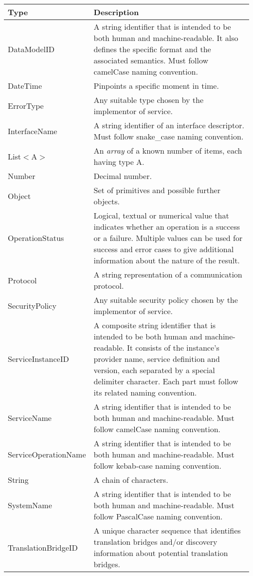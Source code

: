 \documentclass[a4paper]{arrowhead}
\newcommand{\pdef}[1]{{\textcolor{ArrowheadGrey}{#1\label{sec:model:primitives:#1}\label{sec:model:primitives:#1s}\label{sec:model:primitives:#1es}}}}
\begin{document}
\begin{table}[ht!]
\begin{tabularx}{\textwidth}{| p{5cm} | X |} \hline
\rowcolor{gray!33} Type & Description \\ \hline
\pdef{DataModelID} & A string identifier that is intended to be both human and machine-readable. It also defines the specific format and the associated semantics. Must follow camelCase naming convention. \\ \hline
\pdef{DateTime}         & Pinpoints a specific moment in time. \\ \hline
\pdef{ErrorType}        & Any suitable type chosen by the implementor of service. \\ \hline
\pdef{InterfaceName}    & A string identifier of an interface descriptor. Must follow snake\_case naming convention. \\ \hline
\pdef{List}$<$A$>$      & An \textit{array} of a known number of items, each having type A. \\ \hline
\pdef{Number}           & Decimal number. \\ \hline
\pdef{Object}           & Set of primitives and possible further objects. \\ \hline
\pdef{OperationStatus}  & Logical, textual or numerical value that indicates whether an operation is a success or a failure. Multiple values can be used for success and error cases to give additional information about the nature of the result. \\ \hline
\pdef{Protocol}         & A string representation of a communication protocol. \\ \hline
\pdef{SecurityPolicy}   & Any suitable security policy chosen by the implementor of service. \\ \hline
\pdef{ServiceInstanceID} & A composite string identifier that is intended to be both human and machine-readable. It consists of the instance's provider name, service definition and version, each separated by a special delimiter character. Each part must follow its related naming convention. \\ \hline
\pdef{ServiceName}      & A string identifier that is intended to be both human and machine-readable. Must follow camelCase naming convention. \\ \hline
\pdef{ServiceOperationName} & A string identifier that is intended to be both human and machine-readable. Must follow kebab-case naming convention. \\ \hline
\pdef{String}           & A chain of characters. \\ \hline
\pdef{SystemName}       & A string identifier that is intended to be both human and machine-readable. Must follow PascalCase naming convention. \\ \hline
\pdef{TranslationBridgeID} & A unique character sequence that identifies translation bridges and/or discovery information about potential translation bridges. \\ \hline
\end{tabularx}
\end{table}
\end{document}
